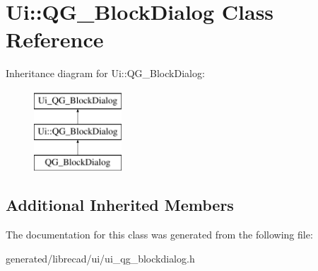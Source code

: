 \hypertarget{classUi_1_1QG__BlockDialog}{\section{Ui\-:\-:Q\-G\-\_\-\-Block\-Dialog Class Reference}
\label{classUi_1_1QG__BlockDialog}
}
Inheritance diagram for Ui\-:\-:Q\-G\-\_\-\-Block\-Dialog\-:\begin{figure}[H]
\begin{center}
\leavevmode
\includegraphics[height=3.000000cm]{classUi_1_1QG__BlockDialog}
\end{center}
\end{figure}
\subsection*{Additional Inherited Members}


The documentation for this class was generated from the following file\-:\begin{DoxyCompactItemize}
\item 
generated/librecad/ui/ui\-\_\-qg\-\_\-blockdialog.\-h\end{DoxyCompactItemize}

